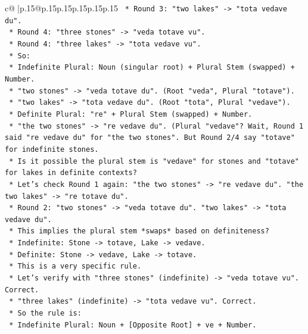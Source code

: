 \documentclass{article}
\begin{document}
{\begin{supertabular}{c@{$\;$}|p{.15\linewidth}@{}p{.15\linewidth}p{.15\linewidth}p{.15\linewidth}p{.15\linewidth}p{.15\linewidth}}
{{{\texttt{        *   Round 3: "two lakes" {-}> "tota vedave du".} \\
\texttt{        *   Round 4: "three stones" {-}> "veda totave vu".} \\
\texttt{        *   Round 4: "three lakes" {-}> "tota vedave vu".} \\
\texttt{        *   So:} \\
\texttt{            *   Indefinite Plural: Noun (singular root) + Plural Stem (swapped) + Number.} \\
\texttt{                *   "two stones" {-}> "veda totave du". (Root "veda", Plural "totave").} \\
\texttt{                *   "two lakes" {-}> "tota vedave du". (Root "tota", Plural "vedave").} \\
\texttt{            *   Definite Plural: "re" + Plural Stem (swapped) + Number.} \\
\texttt{                *   "the two stones" {-}> "re vedave du". (Plural "vedave"? Wait, Round 1 said "re vedave du" for "the two stones". But Round 2/4 say "totave" for indefinite stones.} \\
\texttt{                *   Is it possible the plural stem is "vedave" for stones and "totave" for lakes in definite contexts?} \\
\texttt{                *   Let's check Round 1 again: "the two stones" {-}> "re vedave du". "the two lakes" {-}> "re totave du".} \\
\texttt{                *   Round 2: "two stones" {-}> "veda totave du". "two lakes" {-}> "tota vedave du".} \\
\texttt{                *   This implies the plural stem *swaps* based on definiteness?} \\
\texttt{                *   Indefinite: Stone {-}> totave, Lake {-}> vedave.} \\
\texttt{                *   Definite: Stone {-}> vedave, Lake {-}> totave.} \\
\texttt{                *   This is a very specific rule.} \\
\texttt{                *   Let's verify with "three stones" (indefinite) {-}> "veda totave vu". Correct.} \\
\texttt{                *   "three lakes" (indefinite) {-}> "tota vedave vu". Correct.} \\
\texttt{                *   So the rule is:} \\
\texttt{                    *   Indefinite Plural: Noun + {[}Opposite Root{]} + ve + Number.} \\
}}}
\end{supertabular}}
\end{document}
